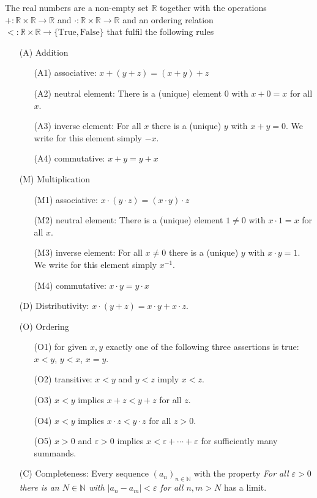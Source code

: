 \begin{Proposition}
The real numbers are a non-empty set $\mathbb{R}$
together with the operations $+ : \mathbb{R} \times \mathbb{R} \rightarrow \mathbb{R}$
and  $\cdot : \mathbb{R} \times \mathbb{R} \rightarrow \mathbb{R}$
and an ordering relation $<: \mathbb{R} \times \mathbb{R} \rightarrow \{\text{True}, \text{False}\}$
that fulfil the following rules
\begin{enumerate}
	\item[(A)] Addition
	\begin{enumerate}[(1)]
		\item[(A1)]  associative: $x + (y + z) = (x + y) + z$
		\item[(A2)]  neutral element: There is a (unique) element $0$
		with $x + 0 = x$ for all $x$.
		\item[(A3)]  inverse element: For all $x$ there is a (unique) $y$
		with $x + y = 0$. We write for this element simply $-x$.
		\item[(A4)]  commutative: $x + y = y + x$
	\end{enumerate}
 	\item[(M)]  Multiplication
	\begin{enumerate}[(1)]
		\item[(M1)] associative: $x \cdot (y \cdot z) = (x \cdot y) \cdot z$
		\item[(M2)] neutral element: There is a (unique) element $1 \! \neq \! 0$
		with $x \! \cdot \! 1 = x$ for all $x$.
		\item[(M3)] inverse element: For all $x \neq 0$ there is a (unique) $y$
		with $x \cdot y = 1$. We write for this element simply $x^{-1}$.
		\item[(M4)] commutative: $x \cdot y = y \cdot x$
	\end{enumerate}
	\item[(D)]  Distributivity: $x \cdot (y + z) = x \cdot y + x \cdot z$.
	\item[(O)]  Ordering
		\begin{enumerate}[(1)]
			\item[(O1)] for given $x,y$ exactly one of the following three
			assertions is true: $x<y$, $y<x$, $x=y$.
			\item[(O2)] transitive: $x<y$ and $y<z$ imply $x<z$.
			\item[(O3)] $x < y$ implies $x + z < y + z$ for all $z$.
			\item[(O4)] $x < y$ implies $x \cdot z < y \cdot z$ for all $z>0$.
			\item[(O5)] $x>0$ and $\varepsilon>0$ implies $x < \varepsilon + \cdots + \varepsilon$ for
			sufficiently many summands.
		\end{enumerate}
	\item[(C)]  Completeness: Every sequence $(a_n)_{n\in \mathbb{N}}$ with the
	property \emph{For all $\varepsilon > 0$ there is an $N \in \mathbb{N}$
	with $|a_n - a_m| < \varepsilon$ for all $n,m > N$} has a limit.
\end{enumerate}
\end{Proposition}


